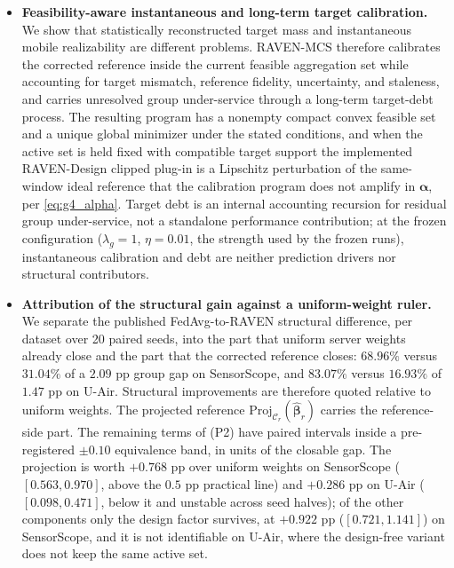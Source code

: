 \documentclass[letterpaper,journal]{IEEEtran}
\begin{document}
\begin{itemize}
    \item \textbf{Feasibility-aware instantaneous and long-term target
    calibration.}
    We show that statistically reconstructed target mass and instantaneous
    mobile realizability are different problems.  RAVEN-MCS therefore calibrates
    the corrected reference inside the current feasible aggregation set while
    accounting for target mismatch, reference fidelity, uncertainty, and
    staleness, and carries unresolved group under-service through a long-term
    target-debt process.  The resulting program has a nonempty compact convex
    feasible set and a unique global minimizer under the stated conditions, and
    when the active set is held fixed with compatible target support the
    implemented RAVEN-Design clipped plug-in is a Lipschitz perturbation of the
    same-window ideal reference that the calibration program does not amplify in
    $\boldsymbol\alpha$, per \eqref{eq:g4_alpha}.
    Target debt is an internal accounting recursion for residual group
    under-service, not a standalone performance contribution; at the frozen
    configuration ($\lambda_g=1$, $\eta=0.01$, the strength used by the frozen
    runs), instantaneous calibration and debt are neither prediction drivers nor
    structural contributors.

    \item \textbf{Attribution of the structural gain against a uniform-weight
    ruler.}
    We separate the published FedAvg-to-RAVEN structural difference, per dataset
    over 20 paired seeds, into the part that uniform server weights already close
    and the part that the corrected reference closes: $68.96\%$ versus $31.04\%$
    of a $2.09$ pp group gap on SensorScope, and $83.07\%$ versus $16.93\%$ of
    $1.47$ pp on U-Air.  Structural improvements are therefore quoted relative to
    uniform weights.  The projected reference
    $\mathrm{Proj}_{\mathcal{C}_r}(\widehat{\boldsymbol\beta}_r)$ carries the
    reference-side part.  The remaining terms of (P2) have paired intervals
    inside a pre-registered $\pm0.10$ equivalence band, in units of the closable
    gap.  The
    projection is worth $+0.768$ pp over uniform weights on SensorScope
    ($[0.563,0.970]$, above the $0.5$ pp practical line) and $+0.286$ pp on
    U-Air ($[0.098,0.471]$, below it and unstable across seed halves); of the
    other components only the design factor survives, at $+0.922$ pp
    ($[0.721,1.141]$) on SensorScope, and it is not identifiable on U-Air, where
    the design-free variant does not keep the same active set.
\end{itemize}
\end{document}
